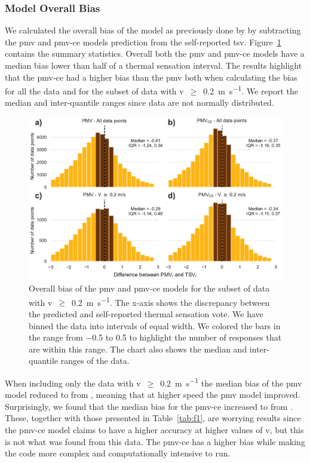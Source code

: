 \subsubsection{Model Overall Bias}\label{subsubsec:model-overall-bias}
We calculated the overall bias of the model as previously done by  by subtracting the \ac{pmv} and \ac{pmv-ce} models prediction from the self-reported \ac{tsv}.
Figure~\ref{fig:hist_discrepancies} contains the summary statistics.
Overall both the \ac{pmv} and \ac{pmv-ce} models have a median bias lower than half of a thermal sensation interval.
The results highlight that the \ac{pmv-ce} had a higher bias than the \ac{pmv} both when calculating the bias for all the data and for the subset of data with \ac{v}~$\geq$~\qty{0.2}{\m\per\s}.
We report the median and inter-quantile ranges since data are not normally distributed.
\begin{figure}[htb!]
    \centering
    \includegraphics[width=\textwidth]{figures/hist_discrepancies}
    \caption{Overall bias of the \ac{pmv} and \ac{pmv-ce} models for the subset of data with \ac{v}~$\geq$~\qty{0.2}{\m\per\s}.
    The x-axis shows the discrepancy between the predicted and self-reported thermal sensation vote.
    We have binned the data into intervals of equal width.
    We colored the bars in the range from \num{-.5} to \num{.5} to highlight the number of responses that are within this range.
    The chart also shows the median and inter-quantile ranges of the data.
    }
    \label{fig:hist_discrepancies}
\end{figure}
When including only the data with \ac{v}~$\geq$~\qty{0.2}{\m\per\s} the median bias of the \ac{pmv} model reduced to  from , meaning that at higher speed the \ac{pmv} model improved.
Surprisingly, we found that the median bias for the \ac{pmv-ce} increased to  from .
These, together with those presented in Table~\ref{tab:f1}, are worrying results since the \ac{pmv-ce} model claims to have a higher accuracy at higher values of \ac{v}, but this is not what was found from this data.
The \ac{pmv-ce} has a higher bias while making the code more complex and computationally intensive to run.

